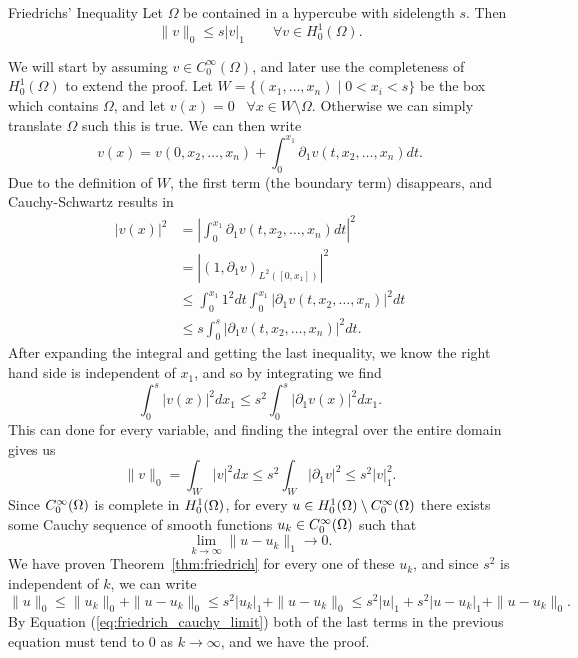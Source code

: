 \begin{thmx}{Friedrichs' Inequality}
Let $\Omega$ be contained in a hypercube with sidelength $s$. Then 
\begin{equation*}
    \| v \|_0 \leq s |v|_1 \quad \quad \forall v \in H_0^1(\Omega).
\end{equation*}\label{thm:friedrich}
\end{thmx}
\begin{bev}
We will start by assuming $v \in C_0^{\infty}(\Omega)$, and later use the 
completeness of $H_0^1(\Omega)$ to extend the proof.
Let $W = \{ (x_1, \ldots, x_n) \mid 0 < x_i < s \}$ be the box 
which contains $\Omega$, and let $v(x)=0$ \, $\forall x
\in W\setminus \Omega$. Otherwise we can simply translate $\Omega$ such 
this is true.
 We can then write 
\begin{equation*}
v(x)=v(0, x_2, \ldots, x_n) + \int_{0}^{x_1} \partial _1 v(t,x_2, \ldots, x_n) dt.
\end{equation*}
Due to the definition of $W$, the first term (the boundary term) 
disappears, and Cauchy-Schwartz results in 
\begin{align*}
    |v(x)|^2 &= \left|\int_{0}^{x_1} \partial _1 v(t,x_2, \ldots, x_n) dt \right|^2 \\ 
    &= |{(1, \partial _1 v)}_{L^2([0,x_1])}|^2 \\
    & \leq \int_{0}^{x_1} 1^2 dt \int_{0}^{x_1}|\partial_1 v(t, x_2, \ldots, x_n)|^2 dt \\ 
    &\leq s \int_{0}^{s}|\partial_1 v(t, x_2, \ldots, x_n)|^2 dt. 
\end{align*}
After expanding the integral and getting the last inequality, we know 
the right hand side is independent of $x_1$, and so by integrating we find 
\begin{equation*}
    \int_{0}^{s}|v(x)|^2dx_1 \leq s^2\int_{0}^{s}|\partial _1 v(x)|^2dx_1.
\end{equation*}
This can done for every variable, and finding the integral over the entire 
domain gives us 
\begin{equation*}
    \|v\|_0 = \int_{W}|v|^2 dx \leq s^2 \int_{W} |\partial _1v|^2 \leq s^2 |v|_1^2.
\end{equation*}
Since $C^\infty_0(\Omega)$ is complete in $H_0^1(\Omega)$, for every $u \in H_0^1(\Omega)\setminus C^\infty_0(\Omega)$
there exists some Cauchy sequence of smooth functions $u_k \in C^\infty_0(\Omega)$
 such that 
\begin{equation}
    \lim_{k \to \infty} \| u-u_k\|_1 \to 0.
    \label{eq:friedrich_cauchy_limit}
\end{equation}
We have proven Theorem~\ref*{thm:friedrich} for every one of these $u_k$, and 
since $s^2$ is independent of $k$, we can write 
\begin{equation*}
    \|u\|_0 \leq \|u_k\|_0 + \|u-u_k\|_0 \leq  s^2|u_k|_1 +  \|u-u_k\|_0 \leq s^2|u|_1 + s^2|u-u_k|_1 + \|u-u_k\|_0.
\end{equation*}
By Equation (\ref*{eq:friedrich_cauchy_limit}) both of the last terms in the 
previous equation must tend to $0$ as $k \to \infty$, and we have the proof.
\end{bev}